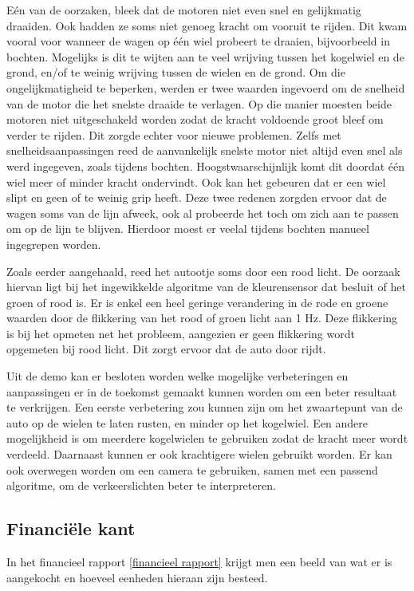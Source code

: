 \documentclass[a4paper,twoside,kulak]{kulakreport} %
\begin{document}
Eén van de oorzaken, bleek dat de motoren niet even snel en gelijkmatig draaiden. Ook hadden ze soms niet genoeg kracht om vooruit te rijden. Dit kwam vooral voor wanneer de wagen op één wiel probeert te draaien, bijvoorbeeld in bochten. Mogelijks is dit te wijten aan te veel wrijving tussen het kogelwiel en de grond, en/of te weinig wrijving tussen de wielen en de grond. Om die ongelijkmatigheid te beperken, werden er twee waarden ingevoerd om de snelheid van de motor die het snelste draaide te verlagen. Op die manier moesten beide motoren niet uitgeschakeld worden zodat de kracht voldoende groot bleef om verder te rijden. Dit zorgde echter voor nieuwe problemen. Zelfs met snelheidsaanpassingen reed de aanvankelijk snelste motor niet altijd even snel als werd ingegeven, zoals tijdens bochten. Hoogstwaarschijnlijk komt dit doordat één wiel meer of minder kracht ondervindt. Ook kan het gebeuren dat er een wiel slipt en geen of te weinig grip heeft. Deze twee redenen zorgden ervoor dat de wagen soms van de lijn afweek, ook al probeerde het toch om zich aan te passen om op de lijn te blijven. Hierdoor moest er veelal tijdens bochten manueel ingegrepen worden.

Zoals eerder aangehaald, reed het autootje soms door een rood licht. De oorzaak hiervan ligt bij het ingewikkelde algoritme van de kleurensensor dat besluit of het groen of rood is. Er is enkel een heel geringe verandering in de rode en groene waarden door de flikkering van het rood of groen licht aan 1 Hz. Deze flikkering is bij het opmeten net het probleem, aangezien er geen flikkering wordt opgemeten bij rood licht. Dit zorgt ervoor dat de auto door rijdt.

Uit de demo kan er besloten worden welke mogelijke verbeteringen en aanpassingen er in de toekomst gemaakt kunnen worden om een beter resultaat te verkrijgen. Een eerste verbetering zou kunnen zijn om het zwaartepunt van de auto op de wielen te laten rusten, en minder op het kogelwiel. Een andere mogelijkheid is om meerdere kogelwielen te gebruiken zodat de kracht meer wordt verdeeld. Daarnaast kunnen er ook krachtigere wielen gebruikt worden. Er kan ook overwegen worden om een camera te gebruiken, samen met een passend algoritme, om de verkeerslichten beter te interpreteren.
\\

\subsection{Financiële kant} 
In het financieel rapport \ref{financieel rapport} krijgt men een beeld van wat er is aangekocht en hoeveel eenheden hieraan zijn besteed.  
\end{document}
